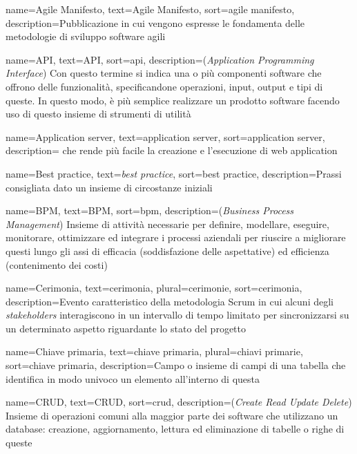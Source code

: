 \renewcommand{\glossaryname}{Glossario}

{
    name={Agile Manifesto},
    text=Agile Manifesto,
    sort=agile manifesto,
    description={Pubblicazione in cui vengono espresse le fondamenta delle metodologie di sviluppo software agili}
}

{
    name={API},
    text=API,
    sort=api,
    description={(\emph{Application Programming Interface}) Con questo termine si indica una o più componenti software che offrono delle funzionalità, specificandone operazioni, input, output e tipi di queste. In questo modo, è più semplice realizzare un prodotto software facendo uso di questo insieme di strumenti di utilità}
}

{
    name={Application server},
    text=application server,
    sort=application server,
    description={ che rende più facile la creazione e l'esecuzione di web application}
}

{
    name={Best practice},
    text=\emph{best practice},
    sort=best practice,
    description={Prassi consigliata dato un insieme di circostanze iniziali}
}

{
    name={BPM},
    text=BPM,
    sort=bpm,
    description={(\emph{Business Process Management}) Insieme di attività necessarie per definire, modellare, eseguire, monitorare, ottimizzare ed integrare i processi aziendali per riuscire a migliorare questi lungo gli assi di efficacia (soddisfazione delle aspettative) ed efficienza (contenimento dei costi)}
}

{
    name={Cerimonia},
    text=cerimonia,
    plural=cerimonie,
    sort=cerimonia,
    description={Evento caratteristico della metodologia Scrum in cui alcuni degli \emph{stakeholders} interagiscono in un intervallo di tempo limitato per sincronizzarsi su un determinato aspetto riguardante lo stato del progetto}
}

{
    name={Chiave primaria},
    text=chiave primaria,
    plural=chiavi primarie,
    sort=chiave primaria,
    description={Campo o insieme di campi di una tabella che identifica in modo univoco un elemento all'interno di questa}
}

{
    name={CRUD},
    text=CRUD,
    sort=crud,
    description={(\emph{Create Read Update Delete}) Insieme di operazioni comuni alla maggior parte dei software che utilizzano un database: creazione, aggiornamento, lettura ed eliminazione di tabelle o righe di queste}
}

